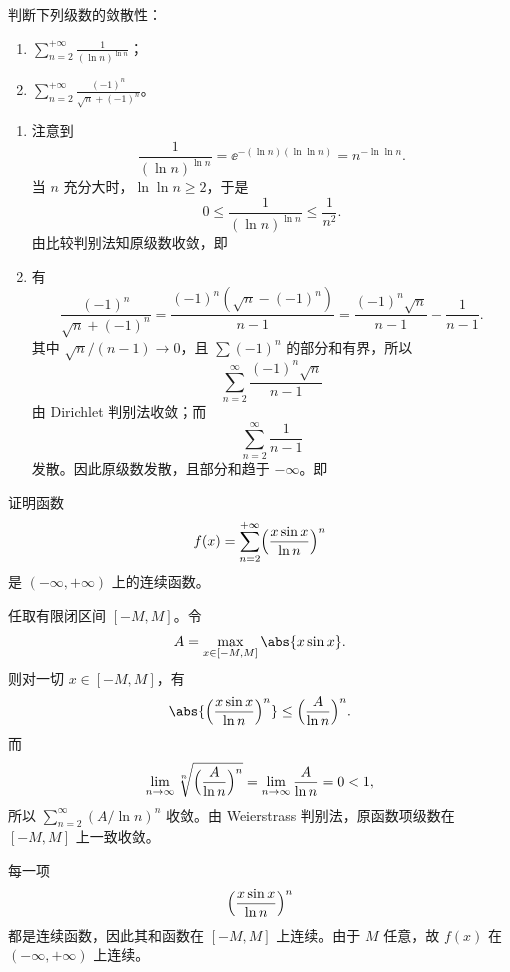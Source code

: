 \begin{question}[级数敛散性判断]

判断下列级数的敛散性：
\begin{enumerate}
\item $\displaystyle \sum_{n=2}^{+\infty}\frac{1}{(\ln n)^{\ln n}}$；
\item $\displaystyle \sum_{n=2}^{+\infty}\frac{(-1)^n}{\sqrt n+(-1)^n}$。
\end{enumerate}

\begin{solution}

\begin{enumerate}
\item 注意到
\[
\frac{1}{(\ln n)^{\ln n}}
=\ee^{-(\ln n)(\ln\ln n)}
=n^{-\ln\ln n}.
\]
当 $n$ 充分大时，$\ln\ln n\ge2$，于是
\[
0\le \frac{1}{(\ln n)^{\ln n}}\le \frac1{n^2}.
\]
由比较判别法知原级数收敛，即

\item 有
\[
\frac{(-1)^n}{\sqrt n+(-1)^n}
=\frac{(-1)^n(\sqrt n-(-1)^n)}{n-1}
=\frac{(-1)^n\sqrt n}{n-1}-\frac1{n-1}.
\]
其中 $\sqrt n/(n-1)\to0$，且 $\sum (-1)^n$ 的部分和有界，所以
\[
\sum_{n=2}^{\infty}\frac{(-1)^n\sqrt n}{n-1}
\]
由 Dirichlet 判别法收敛；而
\[
\sum_{n=2}^{\infty}\frac1{n-1}
\]
发散。因此原级数发散，且部分和趋于 $-\infty$。即
\end{enumerate}

\end{solution}
\end{question}

\begin{question}[函数项级数的连续性]

证明函数
\[
f(x)=\sum_{n=2}^{+\infty}\Bigl(\frac{x\sin x}{\ln n}\Bigr)^n
\]
是 $(-\infty,+\infty)$ 上的连续函数。

\begin{solution}

任取有限闭区间 $[-M,M]$。令
\[
A=\max_{x\in[-M,M]}\abs{x\sin x}.
\]
则对一切 $x\in[-M,M]$，有
\[
\abs{\Bigl(\frac{x\sin x}{\ln n}\Bigr)^n}
\le \Bigl(\frac{A}{\ln n}\Bigr)^n.
\]
而
\[
\lim_{n\to\infty}\sqrt[n]{\Bigl(\frac{A}{\ln n}\Bigr)^n}
=\lim_{n\to\infty}\frac{A}{\ln n}=0<1,
\]
所以 $\sum_{n=2}^{\infty}(A/\ln n)^n$ 收敛。由 Weierstrass 判别法，原函数项级数在 $[-M,M]$ 上一致收敛。

每一项
\[
\Bigl(\frac{x\sin x}{\ln n}\Bigr)^n
\]
都是连续函数，因此其和函数在 $[-M,M]$ 上连续。由于 $M$ 任意，故 $f(x)$ 在 $(-\infty,+\infty)$ 上连续。

\end{solution}
\end{question}

